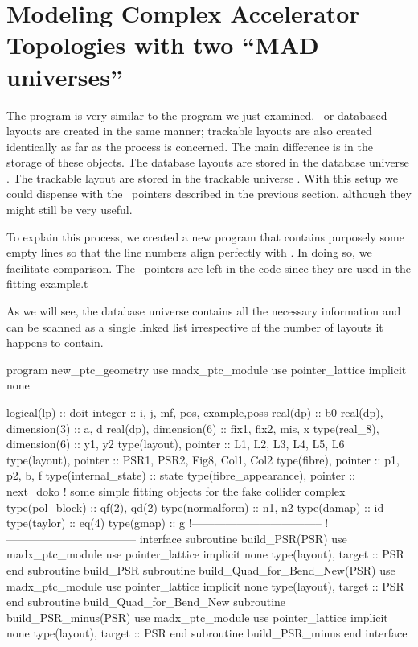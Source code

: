 {
\color{etcol} 

\section{Modeling Complex Accelerator Topologies with two ``MAD universes''}
\label{sec:model.topo2s}



The program  is very similar to the program we just examined. \DNA\ or databased layouts are created in the same manner; trackable layouts are also created identically as far as the process is concerned. The main difference is in the storage of these objects. The database layouts are stored in the database universe . The trackable layout are stored in the trackable universe . With this setup we could dispense with the \DNA\ pointers described in the previous section, although they might still be very useful.

To explain this process, we created a new program  that contains purposely some empty lines so that the line numbers align perfectly with . In doing so, we facilitate comparison. The \DNA\ pointers are left in the code since they are used in the fitting example.t

As we will see, the database universe  contains all the necessary information and can be scanned as a single linked list irrespective of the number of layouts it happens to contain.

\begin{ptccode}[
  label={\ptctitle{\ptc{new_ptc_geometry.f90}\quad\small This program
                   describes the geometry of several \PTC\ lattices using two ``MAD universes.''}}
]
program new_ptc_geometry
use madx_ptc_module
use pointer_lattice
implicit none

logical(lp) :: doit
integer :: i, j, mf, pos, example,poss
real(dp) :: b0
real(dp), dimension(3) :: a, d
real(dp), dimension(6) :: fix1, fix2, mis, x
type(real_8), dimension(6) :: y1, y2
type(layout), pointer :: L1, L2, L3, L4, L5, L6
type(layout), pointer :: PSR1, PSR2, Fig8, Col1, Col2
type(fibre), pointer :: p1, p2, b, f
type(internal_state) :: state
type(fibre_appearance), pointer :: next_doko
! some simple fitting objects for the fake collider complex
type(pol_block) :: qf(2), qd(2)
type(normalform) :: n1, n2
type(damap) :: id
type(taylor) :: eq(4)
type(gmap) :: g
!-----------------------------------
!-----------------------------------
    interface
       subroutine build_PSR(PSR)
         use madx_ptc_module
         use pointer_lattice
         implicit none
         type(layout), target :: PSR
       end subroutine build_PSR
       subroutine build_Quad_for_Bend_New(PSR)
         use madx_ptc_module
         use pointer_lattice
         implicit none
         type(layout), target :: PSR
       end subroutine build_Quad_for_Bend_New
       subroutine build_PSR_minus(PSR)
         use madx_ptc_module
         use pointer_lattice
         implicit none
         type(layout), target :: PSR
       end subroutine build_PSR_minus
    end interface


\end{ptccode}}

